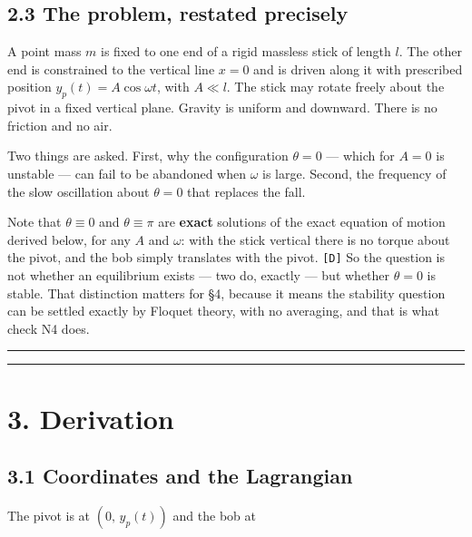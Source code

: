 \documentclass[11pt,a4paper]{article}
\providecommand{\passthrough}[1]{#1}
\begin{document}
\hypertarget{the-problem-restated-precisely}{%
\subsection{2.3 The problem, restated precisely}\label{the-problem-restated-precisely}}

A point mass \(m\) is fixed to one end of a rigid massless stick of length \(l\).
The other end is constrained to the vertical line \(x=0\) and is driven along it
with prescribed position \(y_p(t)=A\cos\omega t\), with \(A\ll l\). The stick may
rotate freely about the pivot in a fixed vertical plane. Gravity is uniform and
downward. There is no friction and no air.

Two things are asked. First, why the configuration \(\theta=0\) --- which for
\(A=0\) is unstable --- can fail to be abandoned when \(\omega\) is large. Second, the
frequency of the slow oscillation about \(\theta=0\) that replaces the fall.

Note that \(\theta\equiv0\) and \(\theta\equiv\pi\) are \textbf{exact} solutions of the
exact equation of motion derived below, for any \(A\) and \(\omega\): with the stick
vertical there is no torque about the pivot, and the bob simply translates with
the pivot. \passthrough{\lstinline![D]!} So the question is not whether an equilibrium exists --- two do,
exactly --- but whether \(\theta=0\) is stable. That distinction matters for §4,
because it means the stability question can be settled exactly by Floquet
theory, with no averaging, and that is what check N4 does.

\begin{center}\rule{0.5\linewidth}{0.5pt}\end{center}

\begin{center}\rule{0.5\linewidth}{0.5pt}\end{center}

\hypertarget{derivation}{%
\section{3. Derivation}\label{derivation}}

\hypertarget{coordinates-and-the-lagrangian}{%
\subsection{3.1 Coordinates and the Lagrangian}\label{coordinates-and-the-lagrangian}}

The pivot is at \((0,\,y_p(t))\) and the bob at
\end{document}
